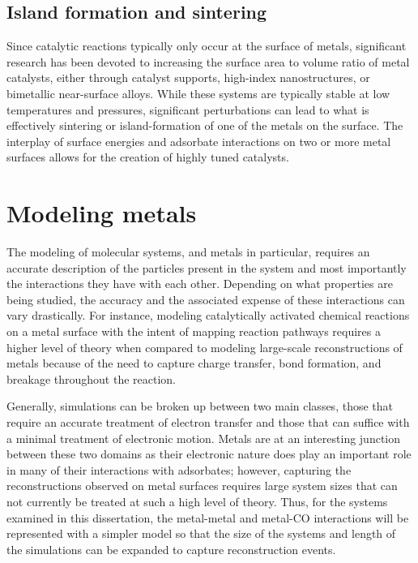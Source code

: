 \subsection{Island formation and sintering}
Since catalytic reactions typically only occur at the surface of metals,
significant research has been devoted to increasing the surface area to volume
ratio of metal catalysts, either through catalyst supports, high-index
nanostructures, or bimetallic near-surface alloys. While these systems are
typically stable at low temperatures and pressures, significant perturbations
can lead to what is effectively sintering or island-formation of one of the
metals on the surface.  The interplay of surface energies and adsorbate
interactions on two or more metal surfaces allows for the creation of
highly tuned catalysts.

\section{Modeling metals}
The modeling of molecular systems, and metals in particular, requires an
accurate description of the particles present in the system and most
importantly the interactions they have with each other. Depending on what
properties are being studied, the accuracy and the associated expense of
these interactions can vary drastically. For instance, modeling catalytically
activated chemical reactions on a metal surface with the intent of mapping
reaction pathways requires a higher level of theory when compared to modeling
large-scale reconstructions of metals because of the need to capture charge
transfer, bond formation, and breakage throughout the reaction.

Generally, simulations can be broken up between two main classes, those that
require an accurate treatment of electron transfer and those that
can suffice with a minimal treatment of electronic motion.  Metals are at an
interesting junction between these two domains as their electronic nature does
play an important role in many of their interactions with adsorbates; however,
capturing the reconstructions observed on metal surfaces requires large system
sizes that can not currently be treated at such a high level of theory. Thus,
for the systems examined in this dissertation, the metal-metal and metal-CO
interactions will be represented with a simpler model so that the size of the
systems and length of the simulations can be expanded to capture reconstruction
events.

